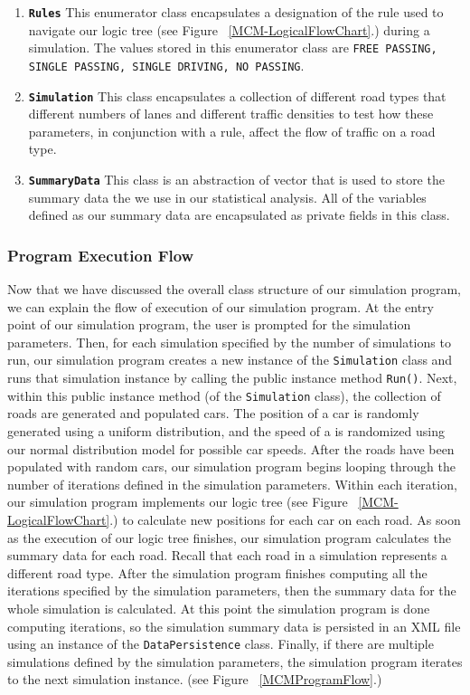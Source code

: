 \documentclass{amsart}
\begin{document}
\begin{enumerate}
{			}
			\item{\textbf{\texttt{Rules}}
				This enumerator class encapsulates a designation of the rule used to navigate our logic tree (see Figure ~\ref{MCM-LogicalFlowChart}.) during a simulation. The values stored in this enumerator class are \texttt{FREE PASSING, SINGLE PASSING, SINGLE DRIVING, NO PASSING}.
			}
			\item{\textbf{\texttt{Simulation}}
				This class encapsulates a collection of different road types that different numbers of lanes and different traffic densities to test how these parameters, in conjunction with a rule, affect the flow of traffic on a road type.
			}
			\item{\textbf{\texttt{SummaryData}}
				This class is an abstraction of vector that is used to store the summary data the we use in our statistical analysis. All of the variables defined as our summary data are encapsulated as private fields in this class.
			}
		\end{enumerate}
		
\newpage

		\subsubsection{Program Execution Flow}		
			Now that we have discussed the overall class structure of our simulation program, we can explain the flow of execution of our simulation program. At the entry point of our simulation program, the user is prompted for the simulation parameters. Then, for each simulation specified by the number of simulations to run, our simulation program creates a new instance of the \texttt{Simulation} class and runs that simulation instance by calling the public instance method \texttt{Run()}. Next, within this public instance method (of the \texttt{Simulation} class), the collection of roads are generated and populated cars. The position of a car is randomly generated using a uniform distribution, and the speed of a is randomized using our normal distribution model for possible car speeds. After the roads have been populated with random cars, our simulation program begins looping through the number of iterations defined in the simulation parameters. Within each iteration, our simulation program implements our logic tree (see Figure ~\ref{MCM-LogicalFlowChart}.) to calculate new positions for each car on each road. As soon as the execution of our logic tree finishes, our simulation program calculates the summary data for each road. Recall that each road in a simulation represents a different road type. After the simulation program finishes computing all the iterations specified by the simulation parameters, then the summary data for the whole simulation is calculated. At this point the simulation program is done computing iterations, so the simulation summary data is persisted in an XML file using an instance of the \texttt{DataPersistence} class. Finally, if there are multiple simulations defined by the simulation parameters, the simulation program iterates to the next simulation instance. (see Figure ~\ref{MCMProgramFlow}.)
		
\end{document}
